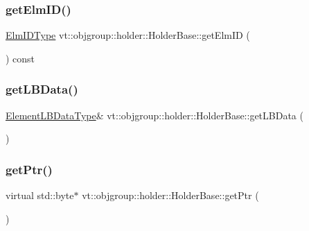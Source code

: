 \subsubsection{\texorpdfstring{get\+Elm\+I\+D()}{getElmID()}}
{\footnotesize\ttfamily \hyperlink{structvt_1_1objgroup_1_1holder_1_1_holder_base_a89c0ce1f23237ab00aee86d4d339bc50}{Elm\+I\+D\+Type} vt\+::objgroup\+::holder\+::\+Holder\+Base\+::get\+Elm\+ID (\begin{DoxyParamCaption}{ }\end{DoxyParamCaption}) const\hspace{0.3cm}{\ttfamily [inline]}}

\mbox{\label{structvt_1_1objgroup_1_1holder_1_1_holder_base_aa4ebca4b40c0c1904650ea6a64342732}} 
\subsubsection{\texorpdfstring{get\+L\+B\+Data()}{getLBData()}}
{\footnotesize\ttfamily \hyperlink{structvt_1_1objgroup_1_1holder_1_1_holder_base_a53deb78d918d7281cf01a0f09e410411}{Element\+L\+B\+Data\+Type}\& vt\+::objgroup\+::holder\+::\+Holder\+Base\+::get\+L\+B\+Data (\begin{DoxyParamCaption}{ }\end{DoxyParamCaption})\hspace{0.3cm}{\ttfamily [inline]}}

\mbox{\label{structvt_1_1objgroup_1_1holder_1_1_holder_base_a9a15090cce1921fe9116a93b11b47be2}} 
\subsubsection{\texorpdfstring{get\+Ptr()}{getPtr()}}
{\footnotesize\ttfamily virtual std\+::byte$\ast$ vt\+::objgroup\+::holder\+::\+Holder\+Base\+::get\+Ptr (\begin{DoxyParamCaption}{ }\end{DoxyParamCaption})\hspace{0.3cm}{\ttfamily [pure virtual]}}



